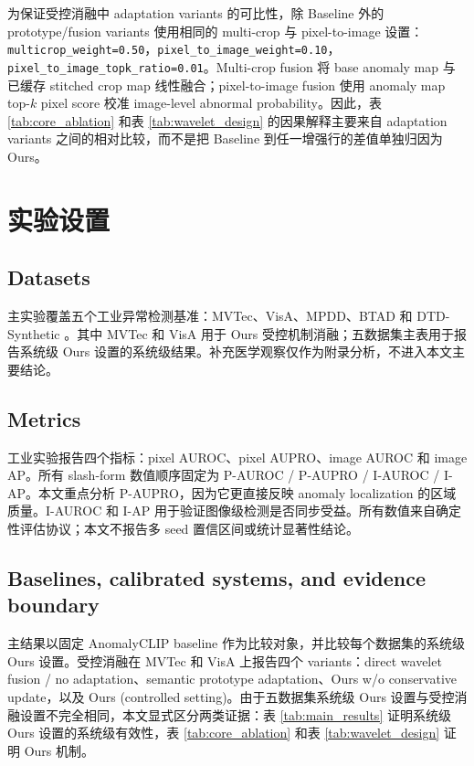 \documentclass[10pt,a4paper,fontset=none]{ctexart}
\begin{document}
为保证受控消融中 adaptation variants 的可比性，除 Baseline 外的 prototype/fusion variants 使用相同的 multi-crop 与 pixel-to-image 设置：\texttt{multicrop\_weight=0.50}，\texttt{pixel\_to\_image\_weight=0.10}，\texttt{pixel\_to\_image\_topk\_ratio=0.01}。Multi-crop fusion 将 base anomaly map 与已缓存 stitched crop map 线性融合；pixel-to-image fusion 使用 anomaly map top-$k$ pixel score 校准 image-level abnormal probability。因此，表 \ref{tab:core_ablation} 和表 \ref{tab:wavelet_design} 的因果解释主要来自 adaptation variants 之间的相对比较，而不是把 Baseline 到任一增强行的差值单独归因为 Ours。

\section{实验设置}

\subsection{Datasets}

主实验覆盖五个工业异常检测基准：MVTec、VisA、MPDD、BTAD 和 DTD-Synthetic \cite{bergmann2019mvtec,bergmann2021mvtec,zou2022visa,jezek2021deep,mishra2021vt,aota2023zero}。其中 MVTec 和 VisA 用于 Ours 受控机制消融；五数据集主表用于报告系统级 Ours 设置的系统级结果。补充医学观察仅作为附录分析，不进入本文主要结论。

\subsection{Metrics}

工业实验报告四个指标：pixel AUROC、pixel AUPRO、image AUROC 和 image AP。所有 slash-form 数值顺序固定为 P-AUROC / P-AUPRO / I-AUROC / I-AP。本文重点分析 P-AUPRO，因为它更直接反映 anomaly localization 的区域质量。I-AUROC 和 I-AP 用于验证图像级检测是否同步受益。所有数值来自确定性评估协议；本文不报告多 seed 置信区间或统计显著性结论。

\subsection{Baselines, calibrated systems, and evidence boundary}

主结果以固定 AnomalyCLIP baseline 作为比较对象，并比较每个数据集的系统级 Ours 设置。受控消融在 MVTec 和 VisA 上报告四个 variants：direct wavelet fusion / no adaptation、semantic prototype adaptation、Ours w/o conservative update，以及 Ours (controlled setting)。由于五数据集系统级 Ours 设置与受控消融设置不完全相同，本文显式区分两类证据：表 \ref{tab:main_results} 证明系统级 Ours 设置的系统级有效性，表 \ref{tab:core_ablation} 和表 \ref{tab:wavelet_design} 证明 Ours 机制。
\end{document}
